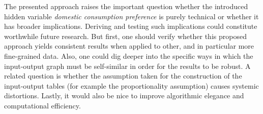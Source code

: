 \documentclass[english]{uzhpub}
\begin{document}
The presented approach raises the important question whether the introduced hidden variable \emph{domestic consumption preference} is purely technical or whether it has broader implications. Deriving and testing such implications could constitute worthwhile future research. But first, one should verify whether this proposed approach yields consistent results when applied to other, and in particular more fine-grained data. Also, one could dig deeper into the specific ways in which the input-output graph must be self-similar in order for the results to be robust. A related question is whether the assumption taken for the construction of the input-output tables (for example the proportionality assumption) causes systemic distortions. Lastly, it would also be nice to improve algorithmic elegance and computational efficiency.


\end{document}

